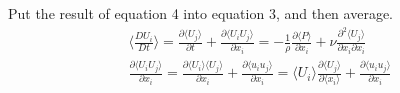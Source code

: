 Put the result of equation 4 into equation 3, and then average.
\begin{equation}
\begin{aligned}
\langle \frac{DU_{i}}{Dt}\rangle =\frac{\partial \langle U_{j}\rangle }{\partial t}+\frac{\partial \langle U_{i}U_{j}\rangle }{\partial x_{i}}=-\frac{1}{\rho}\frac{\partial \langle P\rangle }{\partial x_{i}}+\nu\frac{\partial^2 \langle U_{j}\rangle }{\partial x_{i}\partial x_{i}}\\
\frac{\partial \langle U_{i}U_{j}\rangle }{\partial x_{i}}=\frac{\partial \langle U_{i}\rangle \langle U_{j}\rangle }{\partial x_{i}}+\frac{\partial \langle u_{i}u_{j}\rangle }{\partial x_{i}}=\langle U_{i}\rangle \frac{\partial \langle U_{j}\rangle }{\partial \langle x_{i}\rangle }+\frac{\partial \langle u_{i}u_{j}\rangle }{\partial x_{i}}
\end{aligned}
\end{equation}










